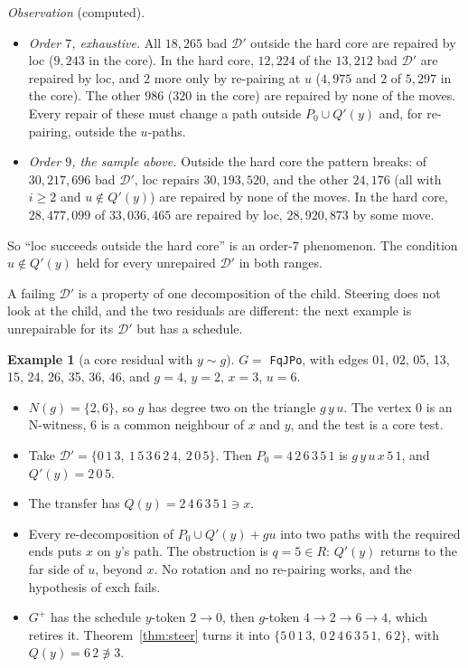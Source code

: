 \documentclass[11pt]{amsart}
\theoremstyle{definition}
\newtheorem{example}[theorem]{Example}
\newcommand{\cD}{\mathcal D}
\begin{document}
\emph{Observation} (computed).
\begin{itemize}
\item \emph{Order $7$, exhaustive.} All $18{,}265$ bad $\cD'$ outside the hard core are repaired by
loc ($9{,}243$ in the core). In the hard core, $12{,}224$ of the $13{,}212$ bad $\cD'$ are repaired
by loc, and $2$ more only by re-pairing at $u$ ($4{,}975$ and $2$ of $5{,}297$ in the core). The
other $986$ ($320$ in the core) are repaired by none of the moves. Every repair of these must change
a path outside $P_0\cup Q'(y)$ and, for re-pairing, outside the $u$-paths.
\item \emph{Order $9$, the sample above.} Outside the hard core the pattern breaks: of $30{,}217{,}696$
bad $\cD'$, loc repairs $30{,}193{,}520$, and the other $24{,}176$ (all with $i\ge2$ and $u\notin
Q'(y)$) are repaired by none of the moves. In the hard core, $28{,}477{,}099$ of $33{,}036{,}465$ are
repaired by loc, $28{,}920{,}873$ by some move.
\end{itemize}
So ``loc succeeds outside the hard core'' is an order-$7$ phenomenon. The condition $u\notin Q'(y)$
held for every unrepaired $\cD'$ in both ranges.

A failing $\cD'$ is a property of one decomposition of the child. Steering does not look at the
child, and the two residuals are different: the next example is unrepairable for its $\cD'$ but has a
schedule.

\begin{example}[a core residual with $y\sim g$]\label{ex:FqJPo}
$G=$ \texttt{FqJPo}, with edges 01, 02, 05, 13, 15, 24, 26, 35, 36, 46, and $g=4$, $y=2$, $x=3$, $u=6$.
\begin{itemize}
\item $N(g)=\{2,6\}$, so $g$ has degree two on the triangle $g\,y\,u$. The vertex $0$ is an N-witness,
$6$ is a common neighbour of $x$ and $y$, and the test is a core test.
\item Take $\cD'=\{0\,1\,3,\ 1\,5\,3\,6\,2\,4,\ 2\,0\,5\}$. Then $P_0=4\,2\,6\,3\,5\,1$ is
$g\,y\,u\,x\,5\,1$, and $Q'(y)=2\,0\,5$.
\item The transfer has $Q(y)=2\,4\,6\,3\,5\,1\ni x$.
\item Every re-decomposition of $P_0\cup Q'(y)+gu$ into two paths with the required ends puts $x$ on
$y$'s path. The obstruction is $q=5\in R$: $Q'(y)$ returns to the far side of $u$, beyond $x$. No
rotation and no re-pairing works, and the hypothesis of exch fails.
\item $G^+$ has the schedule $y$-token $2\to0$, then $g$-token $4\to2\to6\to4$, which retires it.
Theorem~\ref{thm:steer} turns it into $\{5\,0\,1\,3,\ 0\,2\,4\,6\,3\,5\,1,\ 6\,2\}$, with
$Q(y)=6\,2\not\ni3$.
\end{itemize}
\end{example}
\end{document}
